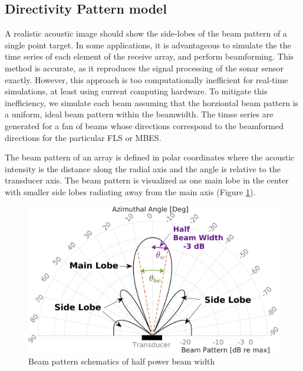 \documentclass[utf8]{frontiersSCNS} %
\begin{document}
\subsection{Directivity Pattern model}
\label{s:beampattern}
A realistic acoustic image should show the side-lobes of the beam pattern of a single point target. In some applications, it is advantageous to simulate the the time series of each element of the receive array, and perform beamforming. This method is accurate, as it reproduces the signal processing of the sonar sensor exactly. However, this approach is too computationally inefficient for real-time simulations, at least using current computing hardware. To mitigate this inefficiency, we simulate each beam assuming that the horziontal beam pattern is a uniform, ideal beam pattern within the beamwidth. The timse series are generated for a fan of beams whose directions correspond to the beamformed directions for the particular FLS or MBES.

The beam pattern of an array is defined in polar coordinates where the acoustic intensity is the distance along the radial axis and the angle is relative to the transducer axis. The beam pattern is visualized as one main lobe in the center with smaller side lobes radiating away from the main axis (Figure \ref{f:bpattern}). 

\begin{figure}[hbt!]
  \centering
  \includegraphics[width=\columnwidth]{images/beam_pattern_plot_w_annotations_mod_crop.png}
  \caption{Beam pattern schematics of half power beam width}
  \label{f:bpattern}
\end{figure}
\end{document}
